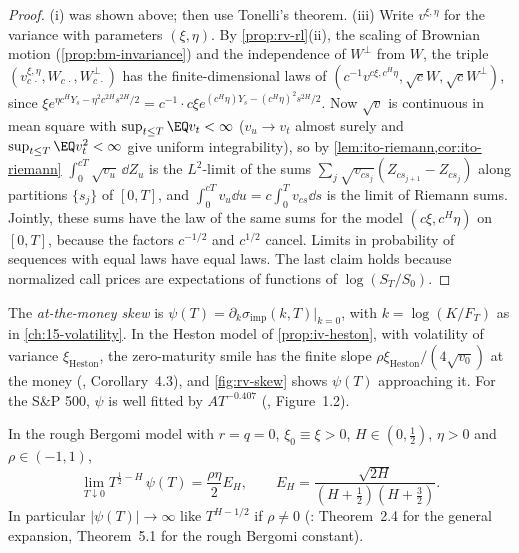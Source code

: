 \begin{proof}
(i) was shown above; then use Tonelli's theorem. (iii) Write $v^{\xi,\eta}$ for the variance with parameters
$(\xi,\eta)$. By \cref{prop:rv-rl}(ii), the scaling of Brownian motion (\cref{prop:bm-invariance}) and the
independence of $W^\perp$ from $W$, the triple $(v^{\xi,\eta}_{c\,\cdot},W_{c\,\cdot},W^\perp_{c\,\cdot})$ has the
finite-dimensional laws of $(c^{-1}v^{c\xi,c^H\eta},\sqrt cW,\sqrt cW^\perp)$, since
$\xi e^{\eta c^HY_s-\eta^2c^{2H}s^{2H}/2}=c^{-1}\cdot c\xi e^{(c^H\eta)Y_s-(c^H\eta)^2s^{2H}/2}$. Now
$\sqrt{v}$ is continuous in mean square with $\sup_{t\le T}\EQ v_t<\infty$ ($v_u\to v_t$ almost surely and
$\sup_{t\le T}\EQ v_t^2<\infty$ give uniform integrability), so by \cref{lem:ito-riemann,cor:ito-riemann}
$\int_0^{cT}\sqrt{v_u}\,\dd Z_u$ is the $L^2$-limit of the sums $\sum_j\sqrt{v_{cs_j}}(Z_{cs_{j+1}}-Z_{cs_j})$
along partitions $\{s_j\}$ of $[0,T]$, and $\int_0^{cT}v_u\dd u=c\int_0^Tv_{cs}\dd s$ is the limit of Riemann
sums. Jointly, these sums have the law of the same sums for the model $(c\xi,c^H\eta)$ on $[0,T]$, because the
factors $c^{-1/2}$ and $c^{1/2}$ cancel. Limits in probability of sequences with equal laws have equal laws.
The last claim holds because normalized call prices are expectations of functions of $\log(S_T/S_0)$.
\end{proof}

The \emph{at-the-money skew} is $\psi(T)=\partial_k\sigma_{\mathrm{imp}}(k,T)|_{k=0}$, with $k=\log(K/F_T)$ as in
\cref{ch:15-volatility}. In the Heston model of \cref{prop:iv-heston}, with volatility of variance
$\xi_{\mathrm{Heston}}$, the zero-maturity smile has the finite slope $\rho\xi_{\mathrm{Heston}}/(4\sqrt{v_0})$ at the
money (\textcite{forde-jacquier-lee-2012}, Corollary~4.3), and \cref{fig:rv-skew} shows $\psi(T)$ approaching it. For the S\&P 500, $\psi$ is well fitted by $AT^{-0.407}$
(\textcite{bayer-friz-gatheral-2016}, Figure~1.2).

\begin{proposition}\label{prop:rv-skew}
In the rough Bergomi model with $r=q=0$, $\xi_0\equiv\xi>0$, $H\in(0,\frac12)$, $\eta>0$ and $\rho\in(-1,1)$,
\begin{equation}\label{eq:rv-skew}
  \lim_{T\downarrow0}T^{\frac12-H}\,\psi(T)=\frac{\rho\eta}2E_H,\qquad E_H=\frac{\sqrt{2H}}{(H+\frac12)(H+\frac32)} .
\end{equation}
In particular $|\psi(T)|\to\infty$ like $T^{H-1/2}$ if $\rho\ne0$
(\textcite{el-euch-fukasawa-gatheral-rosenbaum-2019}: Theorem~2.4 for the general expansion, Theorem~5.1 for the
rough Bergomi constant).
\end{proposition}

